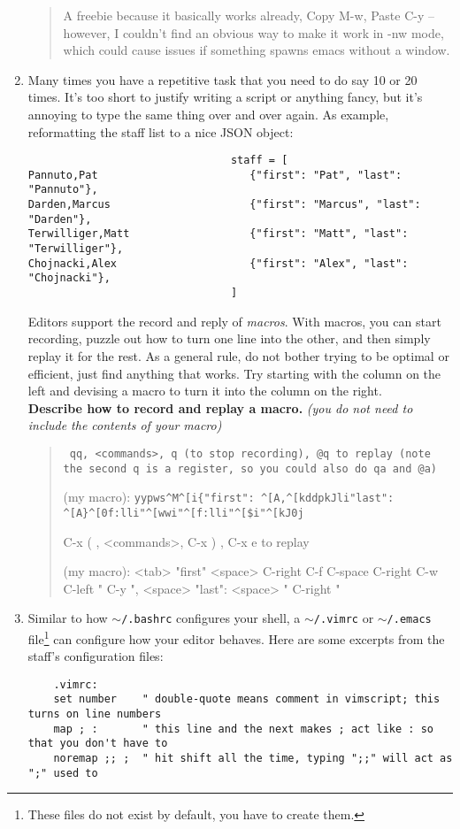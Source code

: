 \documentclass{article}
\begin{document}
\begin{enumerate}
\begin{quote}
      \color{red} A freebie because it basically works already, Copy M-w,
      Paste C-y -- however, I couldn't find an obvious way to make it work in
      -nw mode, which could cause issues if something spawns emacs without a
      window.
    \end{quote}
  \item Many times you have a repetitive task that you need to do say 10 or 20
    times. It's too short to justify writing a script or anything fancy, but
    it's annoying to type the same thing over and over again. As example,
    reformatting the staff list to a nice JSON object:
    \begin{verbatim}                                staff = [
Pannuto,Pat                        {"first": "Pat", "last": "Pannuto"},
Darden,Marcus                      {"first": "Marcus", "last": "Darden"},
Terwilliger,Matt                   {"first": "Matt", "last": "Terwilliger"},
Chojnacki,Alex                     {"first": "Alex", "last": "Chojnacki"},
                                ]\end{verbatim}
    Editors support the record and reply of \emph{macros}. With macros, you
    can start recording, puzzle out how to turn one line into the other, and
    then simply replay it for the rest. As a general rule, do not bother
    trying to be optimal or efficient, just find anything that works.
    Try starting with the column on the left and devising a macro to turn it
    into the column on the right.\\
    \textbf{Describe how to record and replay a macro.}
    \emph{\small (you do not need to include the contents of your macro)}
    \begin{quote}\tt
      \color{blue}qq, <commands>, q (to stop recording), @q to replay (note
      the second q is a register, so you could also do qa and @a)

      {\footnotesize(my macro): \verb!yypws^M^[i{"first": ^[A,^[kddpkJli"last": ^[A}^[0f:lli"^[wwi"^[f:lli"^[$i"^[kJ0j!}

      \color{red} C-x ( , <commands>, C-x ) , C-x e to replay

      {\footnotesize(my macro): <tab> {"first" <space> C-right C-f C-space C-right
          \newline C-w C-left " C-y ", <space> "last": <space> " C-right "}}
    \end{quote}
  \item Similar to how \texttt{$\sim$/.bashrc} configures your shell, a
    \texttt{$\sim$/.vimrc} or \texttt{$\sim$/.emacs} file\footnote{
      These files do not exist by default, you have to create them.
    } can configure how your editor behaves. Here are some excerpts from the
    staff's configuration files:
    {\color{blue}
    \begin{lstlisting}
    .vimrc:
    set number    " double-quote means comment in vimscript; this turns on line numbers
    map ; :       " this line and the next makes ; act like : so that you don't have to
    noremap ;; ;  " hit shift all the time, typing ";;" will act as ";" used to
    \end{lstlisting}
    }


\end{enumerate}
\end{document}
